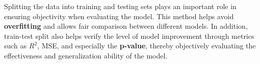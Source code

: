Splitting the data into training and testing sets plays an important role in ensuring objectivity when evaluating the model. This method helps avoid \textbf{overfitting} and allows fair comparison between different models. In addition, train-test split also helps verify the level of model improvement through metrics such as $R^2$, MSE, and especially the \textbf{p-value}, thereby objectively evaluating the effectiveness and generalization ability of the model.